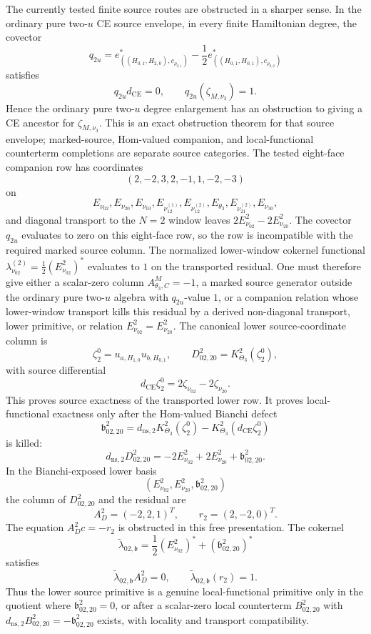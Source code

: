 \documentclass[11pt]{memoir}
\begin{document}
\begin{prop}
  The currently tested finite source routes are obstructed in a sharper
  sense.  In the ordinary pure two-\(u\) CE source envelope, in every
  finite Hamiltonian degree, the covector
  \[
    q_{2u}
    =
    e^*_{((H_{0,1},H_{2,0}),c_{\rho_{2,1}})}
    -\frac12
    e^*_{((H_{0,1},H_{0,1}),c_{\rho_{0,2}})}
  \]
  satisfies
  \[
    q_{2u}d_{\mathrm{CE}}=0,\qquad
    q_{2u}(\zeta_{M,\nu_3})=1.
  \]
  Hence the ordinary pure two-\(u\) degree enlargement has an obstruction to
  giving a CE ancestor for \(\zeta_{M,\nu_3}\).  This is an exact
  obstruction theorem for that source envelope; marked-source, Hom-valued
  companion, and local-functional counterterm completions are separate
  source categories.  The
  tested eight-face companion row has coordinates
  \[
    (2,-2,3,2,-1,1,-2,-3)
  \]
  on
  \[
    E_{\nu_{02}},E_{\nu_{20}},E_{\nu_{03}},
    E_{\nu_{12}^{(1)}},E_{\nu_{12}^{(2)}},
    E_{\theta_3},E_{\nu_{21}^{(2)}},E_{\nu_{30}},
  \]
  and diagonal transport to the \(N=2\) window leaves
  \(2E^2_{\nu_{02}}-2E^2_{\nu_{20}}\).  The covector
  \(q_{2u}\) evaluates to zero on this eight-face row, so the row is
  incompatible with the required marked source column.  The normalized lower-window
  cokernel functional
  \(\lambda^{(2)}_{\nu_{02}}=\frac12(E^2_{\nu_{02}})^*\) evaluates to
  \(1\) on the transported residual.  One must therefore give
  either a scalar-zero column \(A^M_{\theta_3,C}=-1\), a marked source
  generator outside the ordinary pure two-\(u\) algebra with
  \(q_{2u}\)-value \(1\), or a companion relation whose lower-window
  transport kills this residual by a derived non-diagonal transport,
  lower primitive, or relation \(E^2_{\nu_{02}}=E^2_{\nu_{20}}\).  The
  canonical lower source-coordinate column is
  \[
    \zeta^0_2=u_{a,H_{1,0}}u_{b,H_{0,1}},
    \qquad
    D^2_{02,20}
    =
    K^2_{\Theta_3}(\zeta^0_2),
  \]
  with source differential
  \[
    d_{\mathrm{CE}}\zeta^0_2
    =
    2\zeta_{\nu_{02}}-2\zeta_{\nu_{20}}.
  \]
  This proves source exactness of the transported lower row.  It proves
  local-functional exactness only after the Hom-valued Bianchi defect
  \[
    \mathfrak b^2_{02,20}
    =
    d_{\mathrm{ns},2}K^2_{\Theta_3}(\zeta^0_2)
    -
    K^2_{\Theta_3}(d_{\mathrm{CE}}\zeta^0_2)
  \]
  is killed:
  \[
    d_{\mathrm{ns},2}D^2_{02,20}
    =
    -2E^2_{\nu_{02}}+2E^2_{\nu_{20}}
    +\mathfrak b^2_{02,20}.
  \]
  In the Bianchi-exposed lower basis
  \[
    (E^2_{\nu_{02}},E^2_{\nu_{20}},\mathfrak b^2_{02,20})
  \]
  the column of \(D^2_{02,20}\) and the residual are
  \[
    A_D^2=(-2,2,1)^T,\qquad r_2=(2,-2,0)^T .
  \]
  The equation \(A_D^2c=-r_2\) is obstructed in this free
  presentation.  The cokernel
  \[
    \widetilde\lambda_{02,\mathfrak b}
    =
    \frac12(E^2_{\nu_{02}})^*
    +(\mathfrak b^2_{02,20})^*
  \]
  satisfies
  \[
    \widetilde\lambda_{02,\mathfrak b}A_D^2=0,\qquad
    \widetilde\lambda_{02,\mathfrak b}(r_2)=1.
  \]
  Thus the lower source primitive is a genuine local-functional primitive
  only in the quotient where \(\mathfrak b^2_{02,20}=0\), or after a
  scalar-zero local counterterm \(B^2_{02,20}\) with
  \(d_{\mathrm{ns},2}B^2_{02,20}=-\mathfrak b^2_{02,20}\) exists,
  with locality and transport compatibility.


\end{prop}
\end{document}
